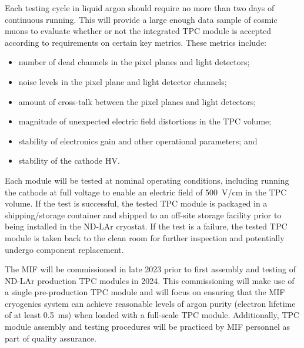 Each testing cycle in liquid argon should require no more than two days of continuous running.  This will provide a large enough data sample of cosmic muons to evaluate whether or not the integrated TPC module is accepted according to requirements on certain key metrics.  These metrics include:
\begin{itemize}
    \item number of dead channels in the pixel planes and light detectors;
    \item noise levels in the pixel plane and light detector channels;
    \item amount of cross-talk between the pixel planes and light detectors;
    \item magnitude of unexpected electric field distortions in the TPC volume;
    \item stability of electronics gain and other operational parameters; and
    \item stability of the cathode HV.
\end{itemize}
Each module will be tested at nominal operating conditions, including running the cathode at full voltage to enable an electric field of \SI{500}{V/cm} in the TPC volume.  If the test is successful, the tested TPC module is packaged in a shipping/storage container and shipped to an off-site storage facility prior to being installed in the ND-LAr cryostat.  If the test is a failure, the tested TPC module is taken back to the clean room for further inspection and potentially undergo component replacement.

The MIF will be commissioned in late 2023 prior to first assembly and testing of ND-LAr production TPC modules in 2024.  This commissioning will make use of a single pre-production TPC module and will focus on ensuring that the MIF cryogenics system can achieve reasonable levels of argon purity (electron lifetime of at least \SI{0.5}{ms}) when loaded with a full-scale TPC module.  Additionally, TPC module assembly and testing procedures will be practiced by MIF personnel as part of quality assurance.



